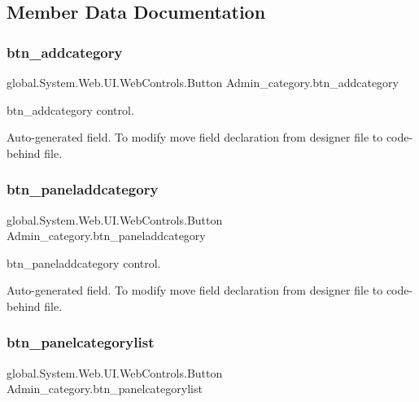 \subsection{Member Data Documentation}
\mbox{\label{class_admin__category_af62f46ac8fd359b679c2f0facb544ea0}} 
\subsubsection{\texorpdfstring{btn\_addcategory}{btn\_addcategory}}
{\footnotesize\ttfamily global.\+System.\+Web.\+U\+I.\+Web\+Controls.\+Button Admin\+\_\+category.\+btn\+\_\+addcategory\hspace{0.3cm}{\ttfamily [protected]}}



btn\+\_\+addcategory control. 

Auto-\/generated field. To modify move field declaration from designer file to code-\/behind file. \mbox{\label{class_admin__category_adf1d24757fb8fcc75e9792f3b35ccad0}} 
\subsubsection{\texorpdfstring{btn\_paneladdcategory}{btn\_paneladdcategory}}
{\footnotesize\ttfamily global.\+System.\+Web.\+U\+I.\+Web\+Controls.\+Button Admin\+\_\+category.\+btn\+\_\+paneladdcategory\hspace{0.3cm}{\ttfamily [protected]}}



btn\+\_\+paneladdcategory control. 

Auto-\/generated field. To modify move field declaration from designer file to code-\/behind file. \mbox{\label{class_admin__category_a2567adbd53297aa5cf0bd79f0ff927d1}} 
\subsubsection{\texorpdfstring{btn\_panelcategorylist}{btn\_panelcategorylist}}
{\footnotesize\ttfamily global.\+System.\+Web.\+U\+I.\+Web\+Controls.\+Button Admin\+\_\+category.\+btn\+\_\+panelcategorylist\hspace{0.3cm}{\ttfamily [protected]}}



